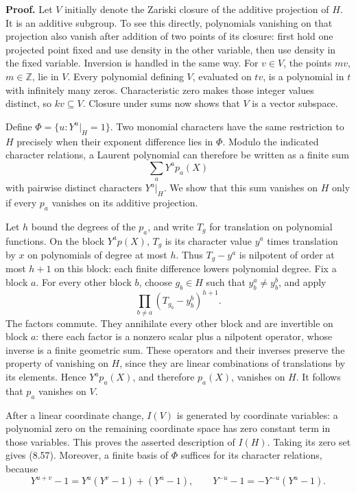 \documentclass[
  11pt,
  a4paper,
]{article}
\begin{document}
\textbf{Proof.} Let \(V\) initially denote the Zariski closure of the
additive projection of \(H\). It is an additive subgroup. To see this
directly, polynomials vanishing on that projection also vanish after
addition of two points of its closure: first hold one projected point
fixed and use density in the other variable, then use density in the
fixed variable. Inversion is handled in the same way. For \(v\in V\),
the points \(mv\), \(m\in\mathbb Z\), lie in \(V\). Every polynomial
defining \(V\), evaluated on \(tv\), is a polynomial in \(t\) with
infinitely many zeros. Characteristic zero makes those integer values
distinct, so \(kv\subseteq V\). Closure under sums now shows that \(V\)
is a vector subspace.

Define \(\Phi=\{u:Y^u|_H=1\}\). Two monomial characters have the same
restriction to \(H\) precisely when their exponent difference lies in
\(\Phi\). Modulo the indicated character relations, a Laurent polynomial
can therefore be written as a finite sum \[
\sum_a Y^a p_a(X)
\] with pairwise distinct characters \(Y^a|_H\). We show that this sum
vanishes on \(H\) only if every \(p_a\) vanishes on its additive
projection.

Let \(h\) bound the degrees of the \(p_a\), and write \(T_g\) for
translation on polynomial functions. On the block \(Y^a p(X)\), \(T_g\)
is its character value \(y^a\) times translation by \(x\) on polynomials
of degree at most \(h\). Thus \(T_g-y^a\) is nilpotent of order at most
\(h+1\) on this block: each finite difference lowers polynomial degree.
Fix a block \(a\). For every other block \(b\), choose \(g_b\in H\) such
that \(y_b^a\ne y_b^b\), and apply \[
\prod_{b\ne a}(T_{g_b}-y_b^b)^{h+1}.
\] The factors commute. They annihilate every other block and are
invertible on block \(a\): there each factor is a nonzero scalar plus a
nilpotent operator, whose inverse is a finite geometric sum. These
operators and their inverses preserve the property of vanishing on
\(H\), since they are linear combinations of translations by its
elements. Hence \(Y^a p_a(X)\), and therefore \(p_a(X)\), vanishes on
\(H\). It follows that \(p_a\) vanishes on \(V\).

After a linear coordinate change, \(I(V)\) is generated by coordinate
variables: a polynomial zero on the remaining coordinate space has zero
constant term in those variables. This proves the asserted description
of \(I(H)\). Taking its zero set gives (8.57). Moreover, a finite basis
of \(\Phi\) suffices for its character relations, because \[
Y^{u+v}-1=Y^u(Y^v-1)+(Y^u-1),\qquad
Y^{-u}-1=-Y^{-u}(Y^u-1).
\]
\end{document}
